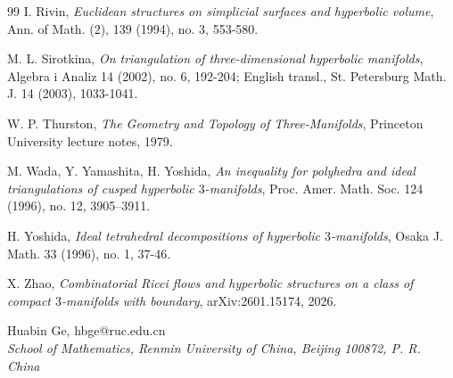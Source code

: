 \documentclass[oneside,a4paper,12pt]{article}
\theoremstyle{plain}
\theoremstyle{definition}
\theoremstyle{remark}
\numberwithin{equation}{section}
\begin{document}
\begin{thebibliography}{99}
I. Rivin,
\emph{Euclidean structures on simplicial surfaces
and hyperbolic volume},
Ann. of Math. (2), 139 (1994), no. 3, 553-580.

M. L. Sirotkina,
\emph{On triangulation of three-dimensional hyperbolic manifolds},
Algebra i Analiz 14 (2002), no. 6, 192-204;
English transl., St. Petersburg Math. J. 14
(2003), 1033-1041.

W. P. Thurston,
\emph{The Geometry and Topology of Three-Manifolds},
Princeton University lecture notes, 1979.


M. Wada, Y. Yamashita, H. Yoshida,
\emph{An inequality for polyhedra and ideal triangulations of cusped hyperbolic $3$-manifolds},
Proc. Amer. Math. Soc. 124 (1996), no. 12,
3905--3911.

H. Yoshida,
\emph{Ideal tetrahedral decompositions of hyperbolic $3$-manifolds},
Osaka J. Math. 33 (1996), no. 1, 37-46.

X. Zhao,
\emph{Combinatorial Ricci flows and hyperbolic structures on a class of compact $3$-manifolds with boundary},
arXiv:2601.15174, 2026.

\end{thebibliography}


\noindent Huabin Ge, hbge@ruc.edu.cn\\[2pt]
\emph{School of Mathematics, Renmin University of China, Beijing 100872, P. R. China}\\[2pt]
\end{document}
